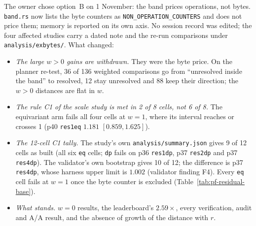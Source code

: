 The owner chose option~B on 1 November: the band prices operations, not
bytes. \texttt{band.rs} now lists the byte counters as
\texttt{NON\_OPERATION\_COUNTERS} and does not price them; memory is
reported on its own axis. No session record was edited; the four affected
studies carry a dated note and the re-run comparisons under
\texttt{analysis/exbytes/}. What changed:
\begin{itemize}
\item \emph{The large $w>0$ gains are withdrawn.} They were the byte price.
  On the planner re-test, 36 of 136 weighted comparisons go from
  ``unresolved inside the band'' to resolved, 12 stay unresolved and 88 keep
  their direction; the $w>0$ distances are flat in $w$.
\item \emph{The rule C1 of the scale study is met in 2 of 8 cells, not 6 of
  8.} The equivariant arm fails all four cells at $w=1$, where its interval
  reaches or crosses 1 (p40 \texttt{res1eq} $1.181$ $[0.859,1.625]$).
\item \emph{The 12-cell C1 tally.} The study's own
  \texttt{analysis/summary.json} gives 9 of 12 cells as built (all six
  \texttt{eq} cells; \texttt{dp} fails on p36 \texttt{res1dp}, p37
  \texttt{res2dp} and p37 \texttt{res4dp}). The validator's own bootstrap
  gives 10 of 12; the difference is p37 \texttt{res4dp}, whose harness
  upper limit is $1.002$ (validator finding F4). Every \texttt{eq} cell
  fails at $w=1$ once the byte counter is excluded
  (Table~\ref{tab:pf-residual-base}).
\item \emph{What stands.} $w=0$ results, the leaderboard's $2.59\times$,
  every verification, audit and A/A result, and the absence of growth of the
  distance with $r$.
\end{itemize}
